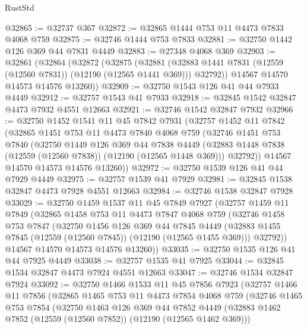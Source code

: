 \begin{lexlean}{RustStd}
\begin{coremodule}
@32865 := @32737 @367
@32872 := @32865 @1444 @753 @11 @4473 @7833 @4068 @759
@32875 := @32746 @1444 @753 @7833
@32881 := @32750 @1442 @126 @369 @44 @7831 @4449
@32883 := @27348 @4068 @369
@32903 := @32861
    (@32864
      (@32872
        (@32875
          (@32881 (@32883 @1441 @7831 (@12559 (@12560 @7831)) (@12190 (@12565 @1441 @369))) @32792))
        @14567
        @14570
        @14573
        @14576
        @13260))
@32909 := @32750 @1543 @126 @41 @44 @7933 @4449
@32912 := @32757 @1543 @41 @7933
@32918 := @32845 @1542 @32847 @4473 @7932 @4551 @12663
@32921 := @32746 @1542 @32847 @7932
@32966 := @32750
    @1452
    @1541
    @11
    @45
    @7842
    @7931
    (@32757
      @1452
      @11
      @7842
      (@32865
        @1451
        @753
        @11
        @4473
        @7840
        @4068
        @759
        (@32746
          @1451
          @753
          @7840
          (@32750
            @1449
            @126
            @369
            @44
            @7838
            @4449
            (@32883 @1448 @7838 (@12559 (@12560 @7838)) (@12190 (@12565 @1448 @369)))
            @32792))
        @14567
        @14570
        @14573
        @14576
        @13260))
@32972 := @32750 @1539 @126 @41 @44 @7929 @4449
@32975 := @32757 @1539 @41 @7929
@32981 := @32845 @1538 @32847 @4473 @7928 @4551 @12663
@32984 := @32746 @1538 @32847 @7928
@33029 := @32750
    @1459
    @1537
    @11
    @45
    @7849
    @7927
    (@32757
      @1459
      @11
      @7849
      (@32865
        @1458
        @753
        @11
        @4473
        @7847
        @4068
        @759
        (@32746
          @1458
          @753
          @7847
          (@32750
            @1456
            @126
            @369
            @44
            @7845
            @4449
            (@32883 @1455 @7845 (@12559 (@12560 @7845)) (@12190 (@12565 @1455 @369)))
            @32792))
        @14567
        @14570
        @14573
        @14576
        @13260))
@33035 := @32750 @1535 @126 @41 @44 @7925 @4449
@33038 := @32757 @1535 @41 @7925
@33044 := @32845 @1534 @32847 @4473 @7924 @4551 @12663
@33047 := @32746 @1534 @32847 @7924
@33092 := @32750
    @1466
    @1533
    @11
    @45
    @7856
    @7923
    (@32757
      @1466
      @11
      @7856
      (@32865
        @1465
        @753
        @11
        @4473
        @7854
        @4068
        @759
        (@32746
          @1465
          @753
          @7854
          (@32750
            @1463
            @126
            @369
            @44
            @7852
            @4449
            (@32883 @1462 @7852 (@12559 (@12560 @7852)) (@12190 (@12565 @1462 @369)))

\end{coremodule}
\end{lexlean}
